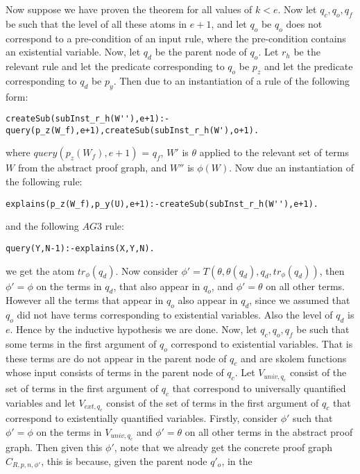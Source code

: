 \documentclass[sigconf]{acmart}
\begin{document}
Now suppose we have proven the theorem for all values of $k<e$. Now let $q_{c},q_{o},q_{f}$ be such that the level of all these atoms in $e+1$, and let $q_{o}$ be $q_{o}$ does not correspond to a pre-condition of an input rule, where the pre-condition contains an existential variable. Now, let $q_{d}$ be the parent node of $q_{o}$. Let $r_{h}$ be the relevant rule and let the predicate corresponding to $q_{o}$ be $p_{z}$ and let the predicate corresponding to $q_{d}$ be $p_{y}$. Then due to an instantiation of a rule of the following form:
\begin{verbatim}
createSub(subInst_r_h(W''),e+1):-query(p_z(W_f),e+1),createSub(subInst_r_h(W'),o+1).
\end{verbatim}
where $query(p_{z}(W_{f}),e+1)$ = $q_{f}$, $W'$ is $\theta$ applied to the relevant set of terms $W$ from the abstract proof graph, and $W''$ is $\phi(W)$. Now due an instantiation of the following rule:
\begin{verbatim}
explains(p_z(W_f),p_y(U),e+1):-createSub(subInst_r_h(W''),e+1).
\end{verbatim} and the following $AG3$ rule:
\begin{verbatim}
query(Y,N-1):-explains(X,Y,N).    
\end{verbatim}
we get the atom $tr_{\phi}(q_{d})$. Now consider
$\phi'= T(\theta, \theta(q_{d}), q_{d}, tr_{\phi}(q_{d}))$, then $\phi'=\phi$
on the terms in $q_{d}$, that also appear in $q_{o}$, and $\phi' = \theta$ on
all other terms. However all the terms that appear in $q_{o}$ also appear in
$q_{d}$, since we assumed that $q_{o}$ did not have terms corresponding to
existential variables. Also the level of $q_{d}$ is $e$. Hence by the
inductive hypothesis we are done. Now, let $q_{c},q_{o},q_{f}$ be such that
some terms in the first argument of $q_{o}$ correspond to existential
variables. That is these terms are do not appear in the parent node of $q_{c}$
and are skolem functions whose input consists of terms in the parent node of
$q_{c}$. Let $V_{univ,q_{c}}$ consist of the set of terms in the first
argument of $q_{c}$ that correspond to universally quantified variables and
let $V_{ext,q_{c}}$ consist of the set of terms in the first argument of
$q_{c}$ that correspond to existentially quantified variables. Firstly,
consider $\phi'$ such that $\phi'=\phi$ on the terms in $V_{univ,q_{c}}$ and
$\phi' =\theta$ on all other terms in the abstract proof graph. Then given
this $\phi'$, note that we already get the concrete proof graph
$C_{R,p,n,\phi'}$, this is because, given the parent node $q'_{o}$, in the
\end{document}
